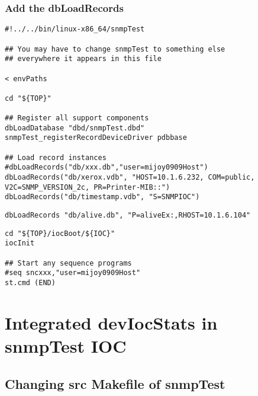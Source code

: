 \documentclass[11pt
  , a4paper
  , article
  , oneside
]{memoir}
\begin{document}
\subsection{Add the dbLoadRecords}
\begin{lstlisting}[style=termstyle]
#!../../bin/linux-x86_64/snmpTest

## You may have to change snmpTest to something else
## everywhere it appears in this file

< envPaths

cd "${TOP}"

## Register all support components
dbLoadDatabase "dbd/snmpTest.dbd"
snmpTest_registerRecordDeviceDriver pdbbase

## Load record instances
#dbLoadRecords("db/xxx.db","user=mijoy0909Host")
dbLoadRecords("db/xerox.vdb", "HOST=10.1.6.232, COM=public, V2C=SNMP_VERSION_2c, PR=Printer-MIB::")
dbLoadRecords("db/timestamp.vdb", "S=SNMPIOC")
\end{lstlisting}
\begin{lstlisting}[style=termstyle]
dbLoadRecords "db/alive.db", "P=aliveEx:,RHOST=10.1.6.104"
\end{lstlisting}
\begin{lstlisting}[style=termstyle]
cd "${TOP}/iocBoot/${IOC}"
iocInit

## Start any sequence programs
#seq sncxxx,"user=mijoy0909Host"
st.cmd (END)
\end{lstlisting}

\chapter{Integrated devIocStats in snmpTest IOC}

\section{Changing src Makefile of snmpTest}
\end{document}
